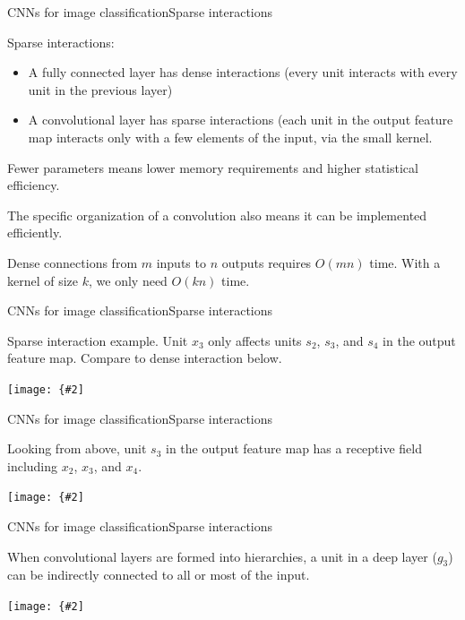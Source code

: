 \documentclass{beamer}
\newcommand{\myfig}[3]{\centerline{\texttt{[image: \{\#2]}}}
\begin{document}
\begin{frame}{CNNs for image classification}{Sparse interactions}

  \alert{Sparse interactions}:
  \begin{itemize}
    \item A fully connected layer has \alert{dense}
interactions (every unit interacts with every unit in the previous
layer)
\item A convolutional layer has \alert{sparse} interactions (each
unit in the output feature map interacts only with a few elements of
the input, via the small kernel.
  \end{itemize}

  \medskip
  
  Fewer parameters means \alert{lower memory requirements} and
  \alert{higher statistical efficiency}.

  \medskip
  
  The specific organization of a convolution also means it can be
  implemented efficiently.

  \medskip

  Dense connections from $m$ inputs to $n$ outputs requires $O(mn)$
  time.  With a kernel of size $k$, we only need $O(kn)$ time.

\end{frame}


\begin{frame}{CNNs for image classification}{Sparse interactions}

Sparse interaction example. Unit $x_3$ only affects units
$s_2$, $s_3$, and $s_4$ in the output feature map.
Compare to dense interaction below.

\myfig{2in}{goodfellow-fig9-2}{Goodfellow et al. (2016), Figure 9.2}

\end{frame}


\begin{frame}{CNNs for image classification}{Sparse interactions}

Looking from above,
unit $s_3$ in the output feature map
has a \alert{receptive field} including $x_2$, $x_3$, and $x_4$.

\myfig{2in}{goodfellow-fig9-3}{Goodfellow et al. (2016), Figure 9.3}

\end{frame}


\begin{frame}{CNNs for image classification}{Sparse interactions}


When convolutional layers are formed into hierarchies, a unit in a
deep layer ($g_3$) can be \alert{indirectly connected} to all or most
of the input.

\medskip

\myfig{2.5in}{goodfellow-fig9-4}{Goodfellow et al. (2016), Figure 9.4}

\end{frame}
\end{document}
